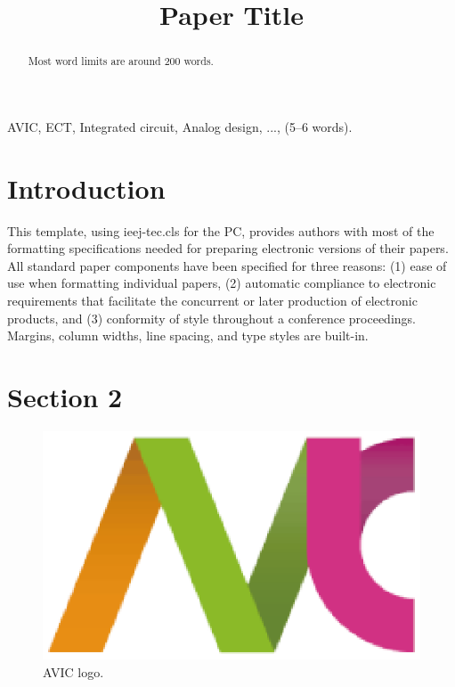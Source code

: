 \documentclass[english, a4paper, 10pt]{ieej-tec}
\title{Paper Title}
\begin{document}
\begin{abstract}
Most word limits are around 200 words.
\end{abstract}

\begin{keyword}
AVIC, ECT, Integrated circuit, Analog design, ..., (5--6 words).
\end{keyword}
\maketitle

\section{Introduction}
This template, using ieej-tec.cls for the PC, provides authors with most of the formatting specifications needed for preparing electronic versions of their papers. All standard paper components have been specified for three reasons: (1) ease of use when formatting individual papers, (2) automatic compliance to electronic requirements that facilitate the concurrent or later production of electronic products, and (3) conformity of style throughout a conference proceedings. Margins, column widths, line spacing, and type styles are built-in.


\section{Section 2}

\begin{figure}[b]
\begin{center}
\includegraphics[scale=0.7]{avic_logo.eps}
\caption{AVIC logo.}
\end{center}
\end{figure}
\end{document}

